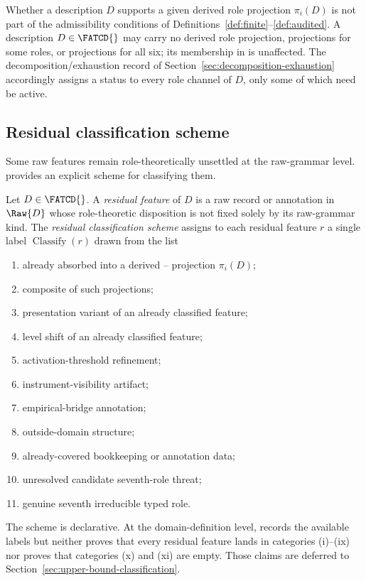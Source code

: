 \begin{remark}\label{rem:projection-vs-membership}
Whether a description \(D\) supports a given derived role projection
\(\pi_i(D)\) is not part of the admissibility conditions of
Definitions~\ref{def:finite}--\ref{def:audited}. A description
\(D \in \FATCD{}\) may carry no derived role projection, projections
for some roles, or projections for all six; its membership in
\FATCD{} is unaffected. The decomposition/exhaustion record of
Section~\ref{sec:decomposition-exhaustion} accordingly assigns a
status to every role channel of \(D\), only some of which need be
active.
\end{remark}

\subsection{Residual classification scheme}\label{subsec:residual-classification}

Some raw features remain role-theoretically unsettled at the
raw-grammar level. \FATCD{} provides an explicit scheme for
classifying them.

\begin{definition}\label{def:residual-scheme}
Let \(D \in \FATCD{}\). A \emph{residual feature} of \(D\) is a raw record
or annotation in \(\Raw{D}\) whose role-theoretic disposition is not fixed
solely by its raw-grammar kind. The \emph{residual classification scheme}
assigns to each residual feature \(r\) a single label
\(\operatorname{Classify}(r)\) drawn from the list
\begin{enumerate}[label=(\roman*),topsep=2pt,itemsep=1pt]
  \item already absorbed into a derived \Pone{}--\Psix{} projection
    \(\pi_i(D)\);
  \item composite of such projections;
  \item presentation variant of an already classified feature;
  \item level shift of an already classified feature;
  \item activation-threshold refinement;
  \item instrument-visibility artifact;
  \item empirical-bridge annotation;
  \item outside-domain structure;
  \item already-covered bookkeeping or annotation data;
  \item unresolved candidate seventh-role threat;
  \item genuine seventh irreducible typed role.
\end{enumerate}
The scheme is declarative. At the domain-definition level, \FATCD{} records
the available labels but neither proves that every residual feature lands in
categories (i)--(ix) nor proves that categories (x) and (xi) are empty. Those
claims are deferred to Section~\ref{sec:upper-bound-classification}.
\end{definition}

